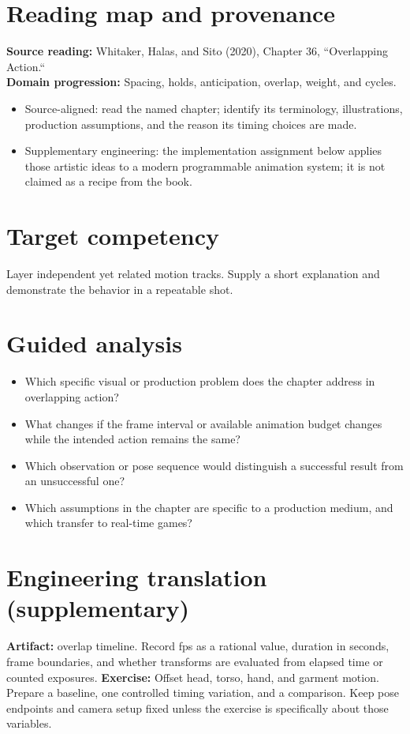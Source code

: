 \documentclass[10pt,letterpaper]{article}
\begin{document}
\makedoctitle
\makedocsummary

\section{Reading map and provenance}
\textbf{Source reading:} Whitaker, Halas, and Sito (2020), Chapter 36, ``Overlapping Action.``\\
\textbf{Domain progression:} Spacing, holds, anticipation, overlap, weight, and cycles.
\begin{itemize}
\item Source-aligned: read the named chapter; identify its terminology, illustrations, production assumptions, and the reason its timing choices are made.
\item Supplementary engineering: the implementation assignment below applies those artistic ideas to a modern programmable animation system; it is not claimed as a recipe from the book.
\end{itemize}
\section{Target competency}
Layer independent yet related motion tracks. Supply a short explanation and demonstrate the behavior in a repeatable shot.
\section{Guided analysis}
\begin{itemize}
\item Which specific visual or production problem does the chapter address in overlapping action?
\item What changes if the frame interval or available animation budget changes while the intended action remains the same?
\item Which observation or pose sequence would distinguish a successful result from an unsuccessful one?
\item Which assumptions in the chapter are specific to a production medium, and which transfer to real-time games?
\end{itemize}
\section{Engineering translation (supplementary)}
\textbf{Artifact:} overlap timeline. Record fps as a rational value, duration in seconds, frame boundaries, and whether transforms are evaluated from elapsed time or counted exposures.
\textbf{Exercise:} Offset head, torso, hand, and garment motion. Prepare a baseline, one controlled timing variation, and a comparison. Keep pose endpoints and camera setup fixed unless the exercise is specifically about those variables.
\end{document}
